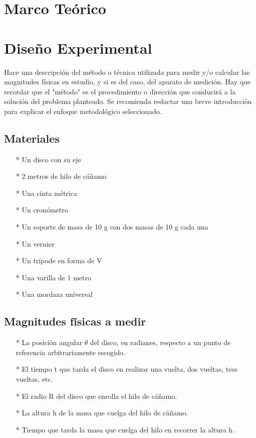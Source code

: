 \documentclass[osajnl,twocolumn,showpacs,superscriptaddress,10pt]{revtex4-1}
\begin{document}
\section{Marco Teórico}

\section{Diseño Experimental}

Hace una descripción del método o técnica utilizada para medir y/o calcular las
magnitudes físicas en estudio, y si es del caso, del aparato de medición. Hay que
recordar que el "método" es el procedimiento o dirección que conducirá a la solución
del problema planteado. Se recomienda redactar una breve introducción para explicar
el enfoque metodológico seleccionado.\\

\subsection{Materiales}
\begin{itemize}

\item[*] Un disco con su eje
\item[*] 2 metros de hilo de cáñamo
\item[*] Una cinta métrica
\item[*] Un cronómetro
\item[*] Un soporte de masa de 10 g con dos masas de 10 g cada una
\item[*] Un vernier
\item[*] Un trípode en forma de V
\item[*] Una varilla de 1 metro
\item[*] Una mordaza universal

\end{itemize}


\subsection{Magnitudes físicas a medir}
\begin{itemize}
\item[*] La posición angular $\theta$ del disco, en radianes, respecto a un punto de referencia arbitrariamente escogido.
\item[*] El tiempo t que tarda el disco en realizar una vuelta, dos vueltas, tres vueltas, etc.
\item[*] El radio R del disco que enrolla el hilo de cáñamo.
\item[*] La altura h de la masa que cuelga del hilo de cáñamo.
\item[*] Tiempo que tarda la masa que cuelga del hilo en recorrer la altura h.
\end{itemize}
\end{document}
